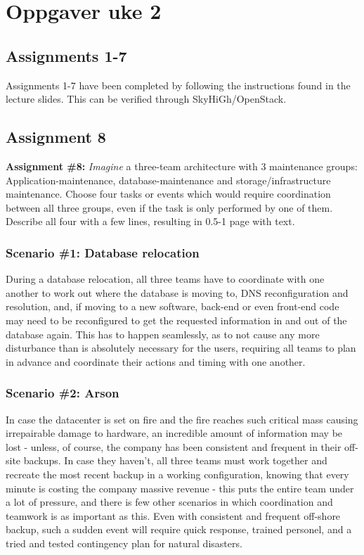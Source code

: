 \section{Oppgaver uke 2}
\subsection{Assignments 1-7} 
Assignments 1-7 have been completed by following the instructions found in the lecture slides. This can be verified through SkyHiGh/OpenStack.

\subsection{Assignment 8}
\textbf{Assignment \#8:} \textit{Imagine} a three-team architecture with 3 maintenance groups: Application-maintenance, database-maintenance and storage/infrastructure maintenance. Choose four tasks or events which would require coordination between all three groups, even if the task is only performed by one of them. Describe all four with a few lines, resulting in 0.5-1 page with text.

\subsubsection{Scenario \#1: Database relocation}
During a database relocation, all three teams have to coordinate with one another to work out where the database is moving to, DNS reconfiguration and resolution, and, if moving to a new software, back-end or even front-end code may need to be reconfigured to get the requested information in and out of the database again. This has to happen seamlessly, as to not cause any more disturbance than is absolutely necessary for the users, requiring all teams to plan in advance and coordinate their actions and timing with one another.

\subsubsection{Scenario \#2: Arson}
In case the datacenter is set on fire and the fire reaches such critical mass causing irrepairable damage to hardware, an incredible amount of information may be lost - unless, of course, the company has been consistent and frequent in their off-site backups. In case they haven't, all three teams must work together and recreate the most recent backup in a working configuration, knowing that every minute is costing the company massive revenue - this puts the entire team under a lot of pressure, and there is few other scenarios in which coordination and teamwork is as important as this. Even with consistent and frequent off-shore backup, such a sudden event will require quick response, trained personel, and a tried and tested contingency plan for natural disasters.

